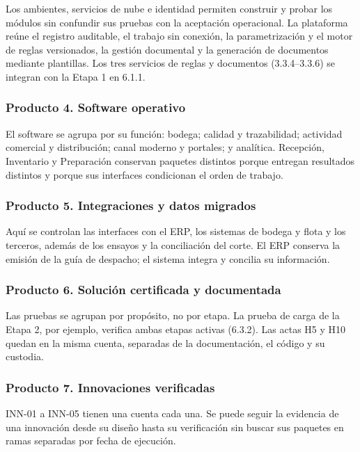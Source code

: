 Los ambientes, servicios de nube e identidad permiten construir y probar los módulos sin confundir sus pruebas con la aceptación operacional. La plataforma reúne el registro auditable, el trabajo sin conexión, la parametrización y el motor de reglas versionados, la gestión documental y la generación de documentos mediante plantillas. Los tres servicios de reglas y documentos (3.3.4–3.3.6) se integran con la Etapa 1 en 6.1.1.

\subsubsection{Producto 4. Software operativo}

El software se agrupa por su función: bodega; calidad y trazabilidad; actividad comercial y distribución; canal moderno y portales; y analítica. Recepción, Inventario y Preparación conservan paquetes distintos porque entregan resultados distintos y porque sus interfaces condicionan el orden de trabajo.

\subsubsection{Producto 5. Integraciones y datos migrados}

Aquí se controlan las interfaces con el ERP, los sistemas de bodega y flota y los terceros, además de los ensayos y la conciliación del corte. El ERP conserva la emisión de la guía de despacho; el sistema integra y concilia su información.

\subsubsection{Producto 6. Solución certificada y documentada}

Las pruebas se agrupan por propósito, no por etapa. La prueba de carga de la Etapa 2, por ejemplo, verifica ambas etapas activas (6.3.2). Las actas H5 y H10 quedan en la misma cuenta, separadas de la documentación, el código y su custodia.

\subsubsection{Producto 7. Innovaciones verificadas}

INN-01 a INN-05 tienen una cuenta cada una. Se puede seguir la evidencia de una innovación desde su diseño hasta su verificación sin buscar sus paquetes en ramas separadas por fecha de ejecución.

